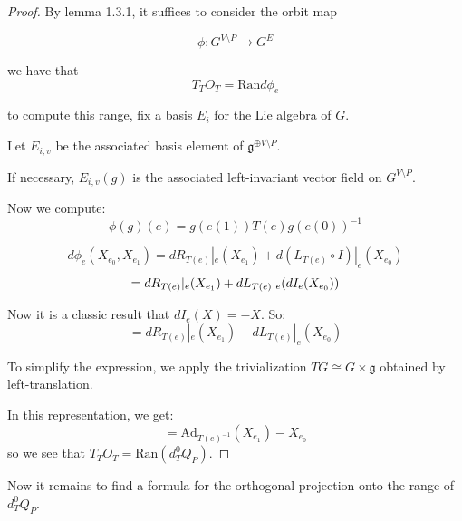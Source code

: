 \documentclass[11pt]{amsart}
\numberwithin{theorem}{subsection}
\numberwithin{lemma}{subsection}
\numberwithin{corollary}{subsection}
\numberwithin{definition}{subsection}
\numberwithin{prop}{subsection}
\begin{document}
\begin{proof}
By lemma 1.3.1, it suffices to consider the orbit map

\[\phi:G^{V\setminus P}\to G^E\]

we have that 
\[T_TO_T = \text{Ran}d\phi_e\]

to compute this range, fix a basis $E_i$ for the Lie algebra of $G$.

Let $E_{i,v}$ be the associated basis element of $\mathfrak{g}^{\oplus V\setminus P}$.

If necessary, $E_{i,v}(g)$ is the associated left-invariant vector field on $G^{V\setminus P}$.

Now we compute:
\[\phi(g)(e) = g(e(1))T(e)g(e(0))^{-1}\]

\[d\phi_e(X_{e_0}, X_{e_1}) = dR_{T(e)}|_e(X_{e_1}) + d(L_{T(e)}\circ I)|_e(X_{e_0})\]
\[= dR_{T(e)}|_e(X_{e_1}) + dL_{T(e)}|_e\qty(dI_e(X_{e_0}))\]

Now it is a classic result that $dI_e(X)=-X$. So:
\[= dR_{T(e)}|_{e}(X_{e_1}) - dL_{T(e)}|_{e}(X_{e_0})\]


To simplify the expression, we apply the trivialization $TG\cong G\times \mathfrak{g}$
obtained by left-translation.

In this representation, we get:
\[= \text{Ad}_{T(e)^{-1}}(X_{e_1})-X_{e_0}\]
so we see that $T_T O_T=\text{Ran}(d_T^0Q_P)$.

\end{proof}

Now it remains to find a formula for the orthogonal projection onto the range of $d_T^0 Q_P$.
\end{document}
